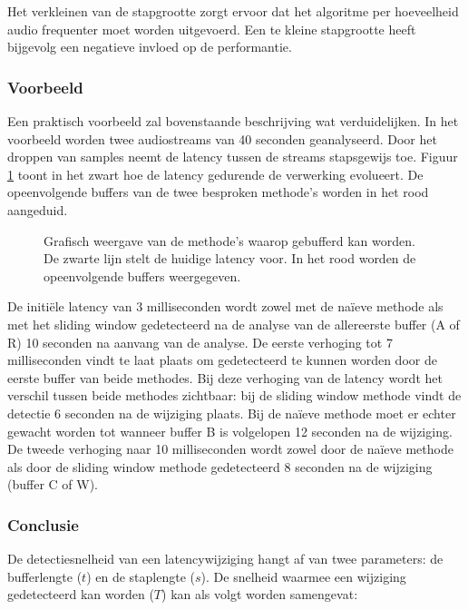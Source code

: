 Het verkleinen van de stapgrootte zorgt ervoor dat het algoritme per hoeveelheid audio frequenter moet worden uitgevoerd. Een te kleine stapgrootte heeft bijgevolg een negatieve invloed op de performantie.

\subsubsection{Voorbeeld}

Een praktisch voorbeeld zal bovenstaande beschrijving wat verduidelijken. In het voorbeeld worden twee audiostreams van 40 seconden geanalyseerd. Door het droppen van samples neemt de latency tussen de streams stapsgewijs toe. Figuur \ref{latency} toont in het zwart hoe de latency gedurende de verwerking evolueert. De opeenvolgende buffers van de twee besproken methode's worden in het rood aangeduid. 

\begin{figure}[h!]
	\captionsetup{width=0.7\textwidth}
	\caption[Voorbeeld buffering methodes]{Grafisch weergave van de methode's waarop gebufferd kan worden. De zwarte lijn stelt de huidige latency voor. In het rood worden de opeenvolgende buffers weergegeven.}
	\begin{center}
		\advance\parskip0.3cm
		
	\end{center}
	\label{latency}
\end{figure}

De initiële latency van 3 milliseconden wordt zowel met de naïeve methode als met het sliding window gedetecteerd na de analyse van de allereerste buffer (A of R) 10 seconden na aanvang van de analyse. De eerste verhoging tot 7 milliseconden vindt te laat plaats om gedetecteerd te kunnen worden door de eerste buffer van beide methodes. Bij deze verhoging van de latency wordt het verschil tussen beide methodes zichtbaar: bij  de sliding window methode vindt de detectie 6 seconden na de wijziging plaats. Bij de naïeve methode moet er echter gewacht worden tot wanneer buffer B is volgelopen 12 seconden na de wijziging. De tweede verhoging naar 10 milliseconden wordt zowel door de naïeve methode als door de sliding window methode gedetecteerd 8 seconden na de wijziging (buffer C of W). 

\subsubsection{Conclusie}

De detectiesnelheid van een latencywijziging hangt af van twee parameters: de bufferlengte ($t$) en de staplengte ($s$). De snelheid waarmee een wijziging gedetecteerd kan worden ($ T $) kan als volgt worden samengevat:

